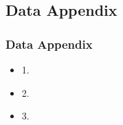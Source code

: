\begin{appendix}
\section{Data Appendix}
\begin{frame}
\frametitle{Data Appendix}
\begin{itemize}

\item 1.
\item 2.
\item 3.

\end{itemize}
\end{frame}
\end{appendix}
